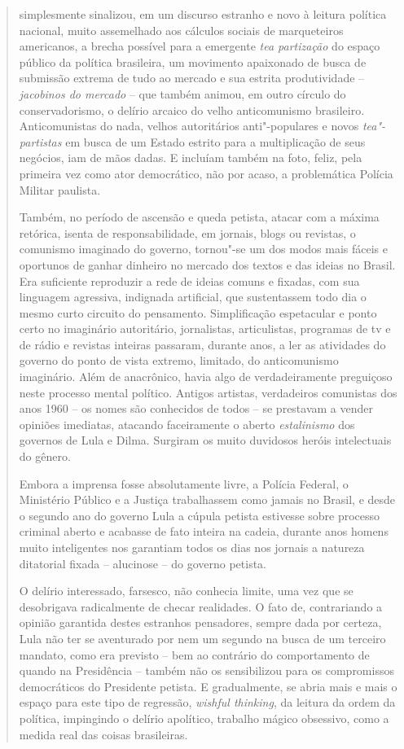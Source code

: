 \begin{quote}
 simplesmente sinalizou, em um discurso estranho e novo à leitura
política nacional, muito assemelhado aos cálculos sociais de
marqueteiros americanos, a brecha possível para a emergente \emph{tea
partização} do espaço público da política brasileira, um movimento
apaixonado de busca de submissão extrema de tudo ao mercado e sua
estrita produtividade -- \emph{jacobinos do mercado} -- que também
animou, em outro círculo do conservadorismo, o delírio arcaico do velho
anticomunismo brasileiro. Anticomunistas do nada, velhos autoritários
anti"-populares e novos \emph{tea"-partistas} em busca de um Estado
estrito para a multiplicação de seus negócios, iam de mãos dadas. E
incluíam também na foto, feliz, pela primeira vez como ator democrático,
não por acaso, a problemática Polícia Militar paulista.

Também, no período de ascensão e queda petista, atacar com a máxima
retórica, isenta de responsabilidade, em jornais, blogs ou revistas, o
comunismo imaginado do governo, tornou"-se um dos modos mais fáceis e
oportunos de ganhar dinheiro no mercado dos textos e das ideias no
Brasil. Era suficiente reproduzir a rede de ideias comuns e fixadas, com
sua linguagem agressiva, indignada artificial, que sustentassem todo dia
o mesmo curto circuito do pensamento. Simplificação espetacular e ponto
certo no imaginário autoritário, jornalistas, articulistas, programas de
tv e de rádio e revistas inteiras passaram, durante anos, a ler as
atividades do governo do ponto de vista extremo, limitado, do
anticomunismo imaginário. Além de anacrônico, havia algo de
verdadeiramente preguiçoso neste processo mental político. Antigos
artistas, verdadeiros comunistas dos anos 1960 -- os nomes são
conhecidos de todos -- se prestavam a vender opiniões imediatas,
atacando faceiramente o aberto \emph{estalinismo} dos governos de Lula e
Dilma. Surgiram os muito duvidosos heróis intelectuais do gênero.

Embora a imprensa fosse absolutamente livre, a Polícia Federal, o
Ministério Público e a Justiça trabalhassem como jamais no Brasil, e
desde o segundo ano do governo Lula a cúpula petista estivesse sobre
processo criminal aberto e acabasse de fato inteira na cadeia, durante
anos homens muito inteligentes nos garantiam todos os dias nos jornais a
natureza ditatorial fixada -- alucinose -- do governo petista.

O delírio interessado, farsesco, não conhecia limite, uma vez que se
desobrigava radicalmente de checar realidades. O fato de, contrariando a
opinião garantida destes estranhos pensadores, sempre dada por certeza,
Lula não ter se aventurado por nem um segundo na busca de um terceiro
mandato, como era previsto -- bem ao contrário do comportamento de 
quando na Presidência -- também não os sensibilizou para os compromissos
democráticos do Presidente petista. E gradualmente, se abria mais e mais
o espaço para este tipo de regressão, \emph{wishful thinking}, da
leitura da ordem da política, impingindo o delírio apolítico, trabalho
mágico obsessivo, como a medida real das coisas brasileiras.


\end{quote}
